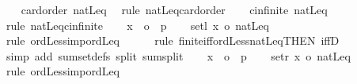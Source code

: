 \begin{isabellebody}
\isanewline
\ \ \isamarkupfalse%
\ {\isachardoublequoteopen}card{\isacharunderscore}{\kern0pt}order\ natLeq{\isachardoublequoteclose}\ \isamarkupfalse%
\ {\isacharparenleft}{\kern0pt}rule\ natLeq{\isacharunderscore}{\kern0pt}card{\isacharunderscore}{\kern0pt}order{\isacharparenright}{\kern0pt}\isanewline
{}\isamarkupfalse%
\isanewline
\ \ \isamarkupfalse%
\ {\isachardoublequoteopen}cinfinite\ natLeq{\isachardoublequoteclose}\ \isamarkupfalse%
\ {\isacharparenleft}{\kern0pt}rule\ natLeq{\isacharunderscore}{\kern0pt}cinfinite{\isacharparenright}{\kern0pt}\isanewline
{}\isamarkupfalse%
\isanewline
\ \ \isamarkupfalse%
\ x\ {\isacharcolon}{\kern0pt}{\isacharcolon}{\kern0pt}\ {\isachardoublequoteopen}{\isacharprime}{\kern0pt}o\ {\isacharplus}{\kern0pt}\ {\isacharprime}{\kern0pt}p{\isachardoublequoteclose}\isanewline
\ \ \isamarkupfalse%
\ {\isachardoublequoteopen}{\isacharbar}{\kern0pt}setl\ x{\isacharbar}{\kern0pt}\ {\isasymle}o\ natLeq{\isachardoublequoteclose}\isanewline
\ \ \ \ \isamarkupfalse%
\ {\isacharparenleft}{\kern0pt}rule\ ordLess{\isacharunderscore}{\kern0pt}imp{\isacharunderscore}{\kern0pt}ordLeq{\isacharparenright}{\kern0pt}\isanewline
\ \ \ \ \isamarkupfalse%
\ {\isacharparenleft}{\kern0pt}rule\ finite{\isacharunderscore}{\kern0pt}iff{\isacharunderscore}{\kern0pt}ordLess{\isacharunderscore}{\kern0pt}natLeq{\isacharbrackleft}{\kern0pt}THEN\ iffD{}{\isacharbrackright}{\kern0pt}{\isacharparenright}{\kern0pt}\isanewline
\ \ \ \ \isamarkupfalse%
\ {\isacharparenleft}{\kern0pt}simp\ add{\isacharcolon}{\kern0pt}\ sum{\isacharunderscore}{\kern0pt}set{\isacharunderscore}{\kern0pt}defs{\isacharparenleft}{\kern0pt}{}{\isacharparenright}{\kern0pt}\ split{\isacharcolon}{\kern0pt}\ sum{\isachardot}{\kern0pt}split{\isacharparenright}{\kern0pt}\isanewline
{}\isamarkupfalse%
\isanewline
\ \ \isamarkupfalse%
\ x\ {\isacharcolon}{\kern0pt}{\isacharcolon}{\kern0pt}\ {\isachardoublequoteopen}{\isacharprime}{\kern0pt}o\ {\isacharplus}{\kern0pt}\ {\isacharprime}{\kern0pt}p{\isachardoublequoteclose}\isanewline
\ \ \isamarkupfalse%
\ {\isachardoublequoteopen}{\isacharbar}{\kern0pt}setr\ x{\isacharbar}{\kern0pt}\ {\isasymle}o\ natLeq{\isachardoublequoteclose}\isanewline
\ \ \ \ \isamarkupfalse%
\ {\isacharparenleft}{\kern0pt}rule\ ordLess{\isacharunderscore}{\kern0pt}imp{\isacharunderscore}{\kern0pt}ordLeq{\isacharparenright}{\kern0pt}\isanewline

\end{isabellebody}
